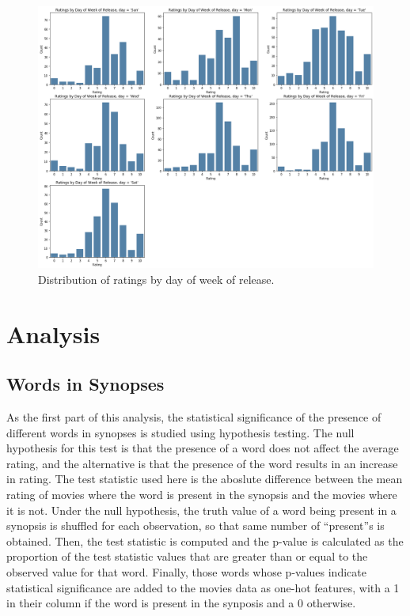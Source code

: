 \documentclass[12pt, oneside]{article}   	%
\begin{document}
\begin{itemize}
\begin{figure}%
\includegraphics[width=\textwidth]{ratings_dow}
\caption{\label{fig:ratings_dow}Distribution of ratings by day of week of release.}
\end{figure}

\end{itemize}

\newpage

\section{Analysis}

\subsection{Words in Synopses}

As the first part of this analysis, the statistical significance of the presence of different words in synopses is studied using hypothesis testing. The null hypothesis for this test is that the presence of a word does not affect the average rating, and the alternative is that the presence of the word results in an increase in rating. The test statistic used here is the aboslute difference between the mean rating of movies where the word is present in the synopsis and the movies where it is not. Under the null hypothesis, the truth value of a word being present in a synopsis is shuffled for each observation, so that same number of ``present''s is obtained. Then, the test statistic is computed and the p-value is calculated as the proportion of the test statistic values that are greater than or equal to the observed value for that word. Finally, those words whose p-values indicate statistical significance are added to the movies data as one-hot features, with a 1 in their column if the word is present in the synposis and a 0 otherwise.
\end{document}
